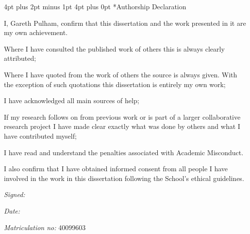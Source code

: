 \documentclass[12pt,a4paper]{article}
\makeatletter
\renewcommand\section{\@startsection {section}{1}{0mm} %
                               {4pt plus 2pt minus 1pt} %
                               {4pt plus 0pt} %
                               {\bfseries}}
\makeatother
\begin{document}
    \section*{Authorship Declaration}
    \vspace{0.5cm}
    \begin{flushleft}
    I, Gareth Pulham, confirm that this dissertation and the work presented in it are my own achievement.\newline

    Where I have consulted the published work of others this is always clearly attributed;\newline

    Where I have quoted from the work of others the source is always given. With the exception of such quotations this
    dissertation is entirely my own work;\newline

    I have acknowledged all main sources of help; \newline

    If my research follows on from previous work or is part of a larger collaborative research project I have made clear
    exactly what was done by others and what I have contributed myself;\newline

    I have read and understand the penalties associated with Academic Misconduct.\newline

    I also confirm that I have obtained informed consent from all people I have involved in the work in this dissertation
    following the School's ethical guidelines.\newline
    \end{flushleft}

    \begin{flushleft} \large
    \emph{Signed:} \\
    \end{flushleft}

    \vspace{.5cm}

    \begin{flushleft} \large
    \emph{Date:} \\
    \end{flushleft}

    \vspace{.5cm}

    \begin{flushleft} \large
    \emph{Matriculation no: } 40099603 \\
    \end{flushleft}
\end{document}
